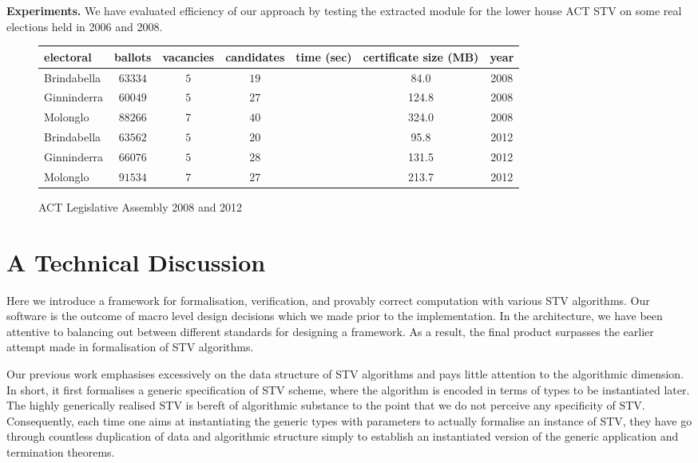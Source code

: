 \documentclass{llncs}
\begin{document}
 \noindent\textbf{Experiments.} We have evaluated efficiency of our approach by testing the extracted module for the lower house ACT STV on some real elections held in 2006 and 2008. 
 \begin{small}
\begin{figure}[b]
\centering
\begin{tabular}{|l |c |c |c |c |c|c|}
\hline
electoral & ballots& vacancies& candidates& time (sec)& certificate size (MB)&year\\
\hline
Brindabella &$63334$&$5$&$19$&&84.0&2008\\
Ginninderra &$60049$&$5$&$27$&&124.8&2008\\
Molonglo &$88266$&$7$&$40$&&324.0&2008\\
Brindabella&$63562$&$5$&$20$&&95.8&2012\\
Ginninderra&$66076$&$5$&$28$&&131.5&2012\\
Molonglo&$91534$&$7$&$27$&&213.7&2012\\
\hline
\end{tabular}
\caption{ACT Legislative Assembly 2008 and 2012}
\label{ref;figure6}
\end{figure}
\end{small}  
\section{A Technical Discussion}
Here we introduce a framework for formalisation, verification, and provably correct computation with various STV algorithms. Our software is the outcome of macro level design decisions which we made prior to the implementation. In the architecture, we have been attentive to  balancing out between different standards for designing a framework. As a result, the final product surpasses the earlier attempt  made in formalisation of STV algorithms\cite{}.

Our previous work emphasises excessively on the data structure of STV algorithms and pays little attention to the algorithmic dimension. In short, it first formalises a  generic  specification of STV scheme, where the algorithm is encoded in terms of types to be instantiated later. The highly generically realised STV is bereft of algorithmic substance to the point that we do not perceive any specificity of STV. Consequently, each time one aims at instantiating the generic types with parameters to actually formalise an instance of STV, they have go through countless  duplication of data and algorithmic structure simply to  establish an instantiated version of the generic application and termination theorems. 
\end{document}
